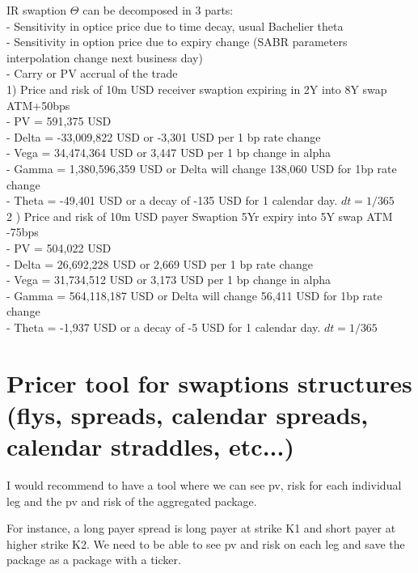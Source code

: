 \documentclass[preprint,pre,floats,aps,amsmath,amssymb]{revtex4}
\numberwithin{equation}{section}
\begin{document}
IR swaption $\Theta$ can be decomposed in 3 parts: \\
- Sensitivity in optice price due to time decay, usual Bachelier theta \\
- Sensitivity in option price due to expiry change (SABR parameters interpolation change next business day) \\
- Carry or PV accrual of the trade \\


1) Price and risk of 10m  USD receiver swaption expiring in 2Y into 8Y swap  ATM+50bps \\

- PV = 591,375 USD \\
- Delta = -33,009,822 USD or -3,301 USD per 1 bp rate change \\
- Vega = 34,474,364 USD or 3,447 USD per 1 bp change in alpha \\
- Gamma = 1,380,596,359 USD or Delta will change 138,060 USD for 1bp rate change \\
- Theta = -49,401 USD or a decay of -135 USD for 1 calendar day.  $dt = 1/365$ \\


2 ) Price and risk of 10m USD payer Swaption 5Yr expiry into 5Y swap ATM -75bps \\

- PV = 504,022 USD \\
- Delta = 26,692,228 USD or 2,669 USD per 1 bp rate change \\
- Vega = 31,734,512 USD or 3,173 USD per 1 bp change in alpha \\
- Gamma = 564,118,187 USD or Delta will change 56,411 USD for 1bp rate change \\
- Theta = -1,937 USD or a decay of -5 USD for 1 calendar day. $dt = 1/365$ \\



\section{Pricer tool for swaptions structures (flys, spreads, calendar spreads, calendar straddles, etc...)}

I would recommend to have a tool where we can see pv, risk for each individual leg and the pv and risk of the aggregated package.

For instance, a long payer spread is long payer at strike K1 and short payer at higher strike K2. We need to be able to see pv and risk on each leg and save the package as a package with a ticker.
\end{document}
